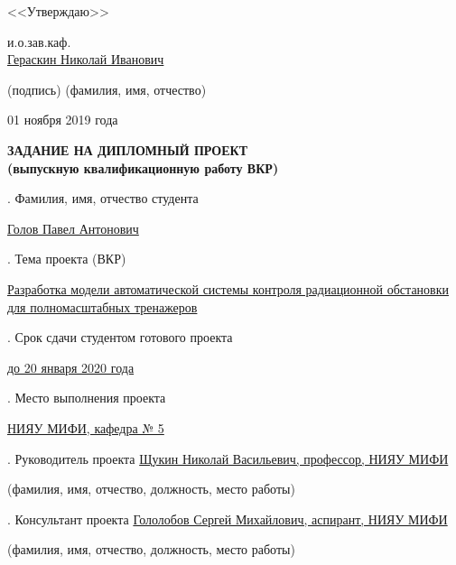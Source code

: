 \hspace{9.8cm}<<Утверждаю>>

\hspace{10cm} и.о.зав.каф.\\[0.1cm]

\hspace{7cm} \uline{\hspace{2.0cm}} \hspace{0.01cm} \uline{Гераскин Николай Иванович}

\hspace{7.5cm} \scriptsize (подпись) \hspace{2.0cm} (фамилия, имя, отчество)

\normalsize
\hspace{9cm} 01 ноября 2019 года\\[0.6cm]

\Large
\begin{center}
\textbf{ЗАДАНИЕ НА ДИПЛОМНЫЙ ПРОЕКТ\\
\normalsize
(выпускную квалификационную работу ВКР)} 
\end{center}

\normalsize
{}. Фамилия, имя, отчество студента

\noindent
\uline{Голов Павел Антонович}

. Тема проекта (ВКР)

\noindent
\uline{Разработка модели автоматической системы контроля радиационной обстановки для полномасштабных тренажеров}

. Срок сдачи студентом готового проекта

\noindent
\uline{до 20 января 2020 года}

. Место выполнения проекта

\noindent
\uline{НИЯУ МИФИ, кафедра № 5}

. Руководитель проекта \uline{Щукин Николай Васильевич, профессор, НИЯУ МИФИ}

\scriptsize \hspace{7cm} (фамилия, имя, отчество, должность, место работы)

\normalsize
{}. Консультант проекта \uline{Гололобов Сергей Михайлович, аспирант, НИЯУ МИФИ}

\scriptsize \hspace{7cm} (фамилия, имя, отчество, должность, место работы)

\clearpage


\normalsize
\clearpage